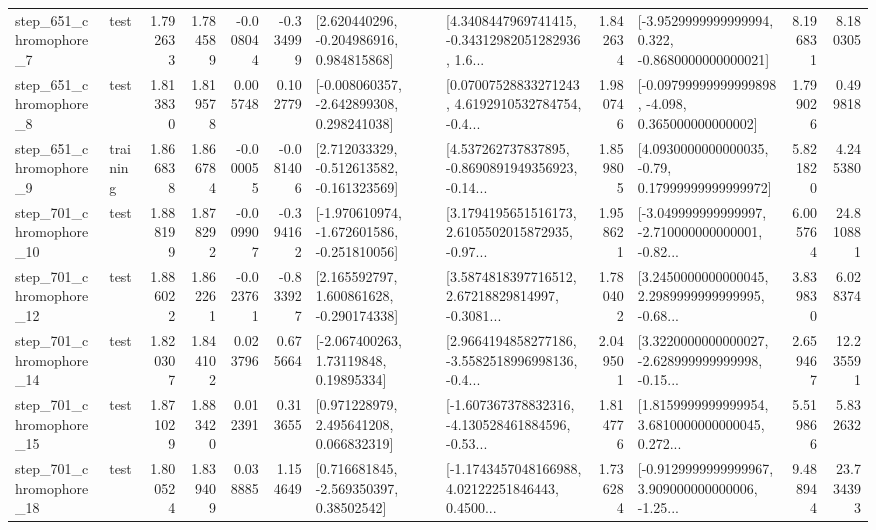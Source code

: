 \begin{tabular}{llrrrrllrlrr}
   step\_651\_chromophore\_7 &      test &      1.792633 &    1.784589 &     -0.008044 & -0.334999 &    [2.620440296, -0.204986916, 0.984815868] &  [4.3408447969741415, -0.34312982051282936, 1.6... &       1.842634 &  [-3.9529999999999994, 0.322, -0.8680000000000021] &            8.196831 &          8.180305 \\
   step\_651\_chromophore\_8 &      test &      1.813830 &    1.819578 &      0.005748 &  0.102779 &   [-0.008060357, -2.642899308, 0.298241038] &  [0.07007528833271243, 4.6192910532784754, -0.4... &       1.980746 &  [-0.09799999999999898, -4.098, 0.365000000000002] &            1.799026 &          0.499818 \\
   step\_651\_chromophore\_9 &  training &      1.866838 &    1.866784 &     -0.000055 & -0.081406 &   [2.712033329, -0.512613582, -0.161323569] &  [4.537262737837895, -0.8690891949356923, -0.14... &       1.859805 &   [4.0930000000000035, -0.79, 0.17999999999999972] &            5.821820 &          4.245380 \\
  step\_701\_chromophore\_10 &      test &      1.888199 &    1.878292 &     -0.009907 & -0.394162 &  [-1.970610974, -1.672601586, -0.251810056] &  [3.1794195651516173, 2.6105502015872935, -0.97... &       1.958621 &  [-3.049999999999997, -2.710000000000001, -0.82... &            6.005764 &         24.810881 \\
  step\_701\_chromophore\_12 &      test &      1.886022 &    1.862261 &     -0.023761 & -0.833927 &    [2.165592797, 1.600861628, -0.290174338] &  [3.5874818397716512, 2.67218829814997, -0.3081... &       1.780402 &  [3.2450000000000045, 2.2989999999999995, -0.68... &            3.839830 &          6.028374 \\
  step\_701\_chromophore\_14 &      test &      1.820307 &    1.844102 &      0.023796 &  0.675664 &      [-2.067400263, 1.73119848, 0.19895334] &  [2.9664194858277186, -3.5582518996998136, -0.4... &       2.049501 &  [3.3220000000000027, -2.628999999999998, -0.15... &            2.659467 &         12.235591 \\
  step\_701\_chromophore\_15 &      test &      1.871029 &    1.883420 &      0.012391 &  0.313655 &     [0.971228979, 2.495641208, 0.066832319] &  [-1.607367378832316, -4.130528461884596, -0.53... &       1.814776 &  [1.8159999999999954, 3.6810000000000045, 0.272... &            5.519866 &          5.832632 \\
  step\_701\_chromophore\_18 &      test &      1.800524 &    1.839409 &      0.038885 &  1.154649 &     [0.716681845, -2.569350397, 0.38502542] &  [-1.1743457048166988, 4.02122251846443, 0.4500... &       1.736284 &  [-0.9129999999999967, 3.909000000000006, -1.25... &            9.488944 &         23.734393 \\

\end{tabular}
